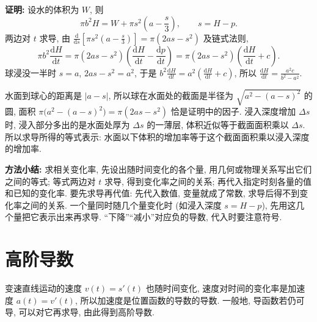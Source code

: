 \documentclass[UTF8,openany]{ctexbook}
\theoremstyle{chinesetextbook}
\newenvironment{cnproof}{\par\indent\textbf{证明:} \ignorespaces}{\par}
\newcommand{\dd}{\mathrm d}
\begin{document}
\begin{center}
\end{center}
\begin{cnproof}
设水的体积为 $W$, 则
\[
\pi b^2H=W+\pi s^2\left(a-\frac s3\right),\qquad s=H-p.
\]
两边对 $t$ 求导, 由 $\displaystyle\frac{\dd}{\dd s}\left[\pi s^2\left(a-\frac s3\right)\right]=\pi(2as-s^2)$ 及链式法则,
\[
\pi b^2\frac{\dd H}{\dd t}=\pi(2as-s^2)\left(\frac{\dd H}{\dd t}-\frac{\dd p}{\dd t}\right)=\pi(2as-s^2)\left(\frac{\dd H}{\dd t}+c\right).
\]
球浸没一半时 $s=a$, $2as-s^2=a^2$, 于是 $\displaystyle b^2\frac{\dd H}{\dd t}=a^2\left(\frac{\dd H}{\dd t}+c\right)$, 所以 $\displaystyle\frac{\dd H}{\dd t}=\frac{a^2c}{b^2-a^2}$.
\end{cnproof}
水面到球心的距离是 $|a-s|$, 所以球在水面处的截面是半径为 $\sqrt{a^2-(a-s)^2}$ 的圆, 面积 $\pi\bigl(a^2-(a-s)^2\bigr)=\pi(2as-s^2)$ 恰是证明中的因子. 浸入深度增加 $\Delta s$ 时, 浸入部分多出的是水面处厚为 $\Delta s$ 的一薄层, 体积近似等于截面面积乘以 $\Delta s$. 所以求导所得的等式表示: 水面以下体积的增加率等于这个截面面积乘以浸入深度的增加率.
\par\indent\textbf{方法小结:} 求相关变化率, 先设出随时间变化的各个量, 用几何或物理关系写出它们之间的等式; 等式两边对 $t$ 求导, 得到变化率之间的关系; 再代入指定时刻各量的值和已知的变化率. 要先求导再代值: 先代入数值, 变量就成了常数, 求导后得不到变化率之间的关系. 一个量同时随几个量变化时 (如浸入深度 $s=H-p$), 先用这几个量把它表示出来再求导. “下降”“减小”对应负的导数, 代入时要注意符号.
\section{高阶导数}
变速直线运动的速度 $v(t)=s'(t)$ 也随时间变化, 速度对时间的变化率是加速度 $a(t)=v'(t)$, 所以加速度是位置函数的导数的导数. 一般地, 导函数若仍可导, 可以对它再求导, 由此得到高阶导数.
\end{document}
